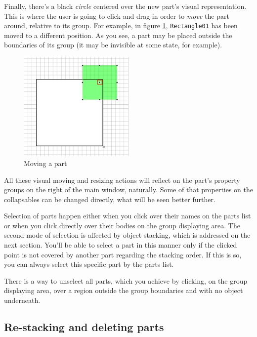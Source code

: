 \documentclass[a4paper]{profusion}
\begin{document}
Finally, there's a black \emph{circle} centered over the new part's
visual representation. This is where the user is going to click and
drag in order to \emph{move} the part around, relative to its
group. For example, in figure \ref{fig:rectangle_move},
\texttt{Rectangle01} has been moved to a different position. As you
see, a part may be placed outside the boundaries of its group (it may
be invisible at some state, for example).

\begin{figure}[h!]
  \centering
  \includegraphics[width=0.5\textwidth]{images/rectangle_move.png}
  \caption{Moving a part}
  \label{fig:rectangle_move}
\end{figure}

All these visual moving and resizing actions will reflect on the
part's property groups on the right of the main window,
naturally. Some of that properties on the collapsables can be changed
directly, what will be seen better further.

Selection of parts happen either when you click over their names on
the parts list or when you click directly over their bodies on the
group displaying area. The second mode of selection is affected by
object stacking, which is addressed on the next section. You'll be
able to select a part in this manner only if the clicked point is not
covered by another part regarding the stacking order. If this is so,
you can always select this specific part by the parts list.

There is a way to unselect all parts, which you achieve by clicking,
on the group displaying area, over a region outside the group
boundaries and with no object underneath.

\subsection{Re-stacking and deleting parts}
\end{document}
